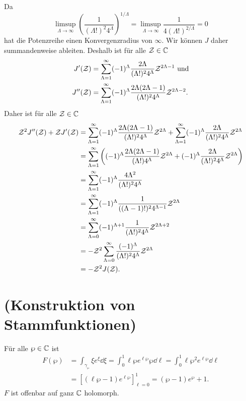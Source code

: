 \documentclass[a4paper,10pt]{article}
\begin{document}
Da
\[
 \limsup_{\Lambda \to \infty} \left( \frac{1}{(\Lambda!)^2 4^\Lambda} \right)^{1/\Lambda} = \limsup_{\Lambda \to \infty} \frac{1}{4 (\Lambda!)^{2/\Lambda}} = 0
\]
hat die Potenzreihe einen Konvergenzradius von $\infty$. Wir können $J$ daher summandenweise ableiten. Deshalb ist für alle $\mathcal{Z} \in \mathbb{C}$
\begin{align*}
  J'(\mathcal{Z}) &= \sum_{\Lambda=1}^\infty (-1)^\Lambda \frac{2\Lambda}{(\Lambda!)^2 4^\Lambda}{\mathcal{Z}^{2\Lambda-1}} \text{ und} \\
 J''(\mathcal{Z}) &= \sum_{\Lambda=1}^\infty (-1)^\Lambda \frac{2\Lambda (2\Lambda-1)}{(\Lambda!)^2 4^\Lambda} \mathcal{Z}^{2\Lambda-2}.
\end{align*}
Daher ist für alle $\mathcal{Z} \in \mathbb{C}$
\begin{align*}
 \mathcal{Z}^2 J''(\mathcal{Z}) + \mathcal{Z} J'(\mathcal{Z})
 &= \sum_{\Lambda=1}^\infty (-1)^\Lambda \frac{2\Lambda(2\Lambda-1)}{(\Lambda!)^2 4^\Lambda} \mathcal{Z}^{2\Lambda} + \sum_{\Lambda=1}^\infty (-1)^\Lambda \frac{2\Lambda}{(\Lambda!)^2 4^\Lambda} \mathcal{Z}^{2\Lambda} \\
 &= \sum_{\Lambda=1}^\infty \left( (-1)^\Lambda \frac{2\Lambda(2\Lambda-1)}{(\Lambda!)4^\Lambda} \mathcal{Z}^{2\Lambda} + (-1)^\Lambda \frac{2\Lambda}{(\Lambda!)^2 4^\Lambda} \mathcal{Z}^{2\Lambda} \right) \\
 &= \sum_{\Lambda=1}^\infty (-1)^\Lambda \frac{4\Lambda^2}{(\Lambda!)^2 4^\Lambda} \\
 &= \sum_{\Lambda=1}^\infty (-1)^\Lambda \frac{1}{((\Lambda-1)!)^2 4^{\Lambda-1}} \mathcal{Z}^{2\Lambda} \\
 &= \sum_{\Lambda=0}^\infty (-1)^{\Lambda+1} \frac{1}{(\Lambda!)^2 4^\Lambda} \mathcal{Z}^{2\Lambda+2} \\
 &= -\mathcal{Z}^2 \sum_{\Lambda=0}^\infty \frac{(-1)^\Lambda}{(\Lambda!)^2 4^\Lambda} \mathcal{Z}^{2\Lambda} \\
 &= -\mathcal{Z}^2 J(\mathcal{Z}).
\end{align*}






\section{(Konstruktion von Stammfunktionen)}
Für alle $\wp \in \mathbb{C}$ ist
\begin{align*}
 F(\wp)
 &= \int_{\gamma_\wp} \xi e^{\xi} \dd{\xi}
 = \int_0^1 \ell \wp e^{\ell \wp} \wp \dd{\ell}
 = \int_0^1 \ell \wp^2 e^{\ell \wp} \dd{\ell} \\
 &= \left[ (\ell \wp-1) e^{\ell \wp} \right]_{\ell=0}^1
 = (\wp-1)e^\wp + 1.
\end{align*}
$F$ ist offenbar auf ganz $\mathbb{C}$ holomorph.
\end{document}
